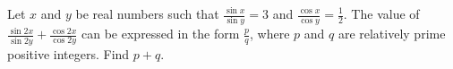 Let $x$ and $y$ be real numbers such that $\frac{\sin{x}}{\sin{y}} = 3$ and $\frac{\cos{x}}{\cos{y}} = \frac{1}{2}$. The value of $\frac{\sin{2x}}{\sin{2y}} + \frac{\cos{2x}}{\cos{2y}}$ can be expressed in the form $\frac{p}{q}$, where $p$ and $q$ are relatively prime positive integers. Find $p + q$.